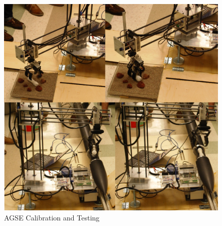 \begin{figure}[h]
	\centering	
	\includegraphics[width=1.0\linewidth]{figs/AGSE_Operation.png}
	\caption{AGSE Calibration and Testing}
	\label{fig:AGSE_Operation}	
\end{figure}
\vspace{-0.1in}

